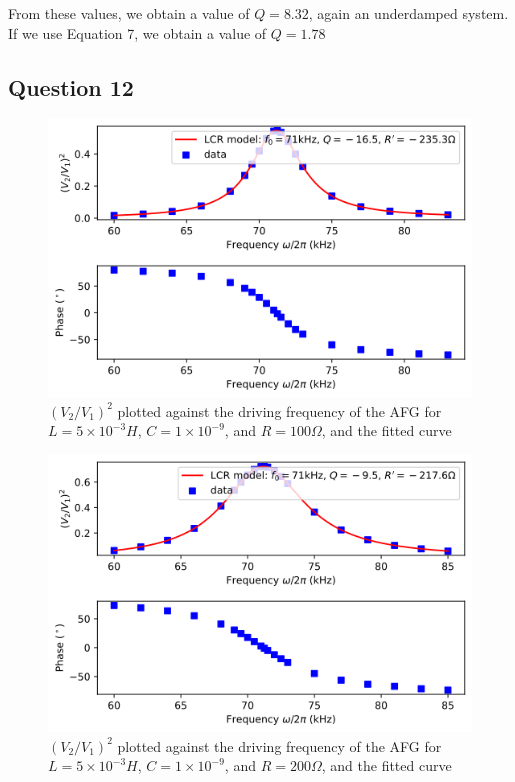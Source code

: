 \documentclass[a4paper]{article}
\begin{document}
From these values, we obtain a value of $Q=8.32$, again an underdamped system. If we use Equation 7, we obtain a value of $Q=1.78$
\newpage
\subsection{Question 12}
\begin{figure}[!h]
\includegraphics[scale=0.8]{res1.png}
\caption{$(V_2/V_1)^2$ plotted against the driving frequency of the AFG for $L=5\times10^{-3} H$, $C=1\times10^{-9}$, and  $R=100 \Omega$, and the fitted curve}
\end{figure}
\begin{figure}[!h]
\includegraphics[scale=0.8]{res2.png}
\caption{$(V_2/V_1)^2$ plotted against the driving frequency of the AFG for $L=5\times10^{-3} H$, $C=1\times10^{-9}$, and  $R=200 \Omega$, and the fitted curve}
\end{figure}
\end{document}
